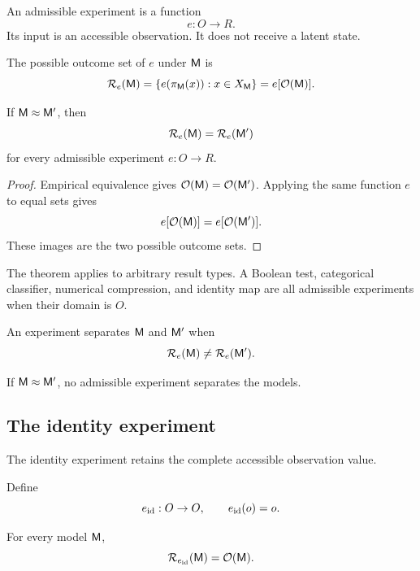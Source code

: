 \begin{definition}
An admissible experiment is a function
\[
e:O\to R.
\]
Its input is an accessible observation. It does not receive a latent state.
\end{definition}
\begin{definition}
The possible outcome set of \(e\) under \(\mathsf M\) is
\[
\mathcal R_e(\mathsf M)
=
\{e(\pi_\mathsf M(x)):x\in X_\mathsf M\}
=
e[\mathcal O(\mathsf M)].
\]
\end{definition}
\begin{theorem}
If \(\mathsf M\approx\mathsf M'\), then
\[
\mathcal R_e(\mathsf M)=\mathcal R_e(\mathsf M')
\]
for every admissible experiment \(e:O\to R\).
\label{thm:outcomeinvariance}
\end{theorem}

\begin{proof}
Empirical equivalence gives \(\mathcal O(\mathsf M)=\mathcal O(\mathsf M')\). Applying the same function \(e\) to equal sets gives
\[
e[\mathcal O(\mathsf M)]=e[\mathcal O(\mathsf M')].
\]
These images are the two possible outcome sets.
\end{proof}
The theorem applies to arbitrary result types. A Boolean test, categorical classifier, numerical compression, and identity map are all admissible experiments when their domain is \(O\).

\begin{definition}
An experiment separates \(\mathsf M\) and \(\mathsf M'\) when
\[
\mathcal R_e(\mathsf M)\neq\mathcal R_e(\mathsf M').
\]
\end{definition}
\begin{corollary}
If \(\mathsf M\approx\mathsf M'\), no admissible experiment separates the models.
\end{corollary}
\subsection{The identity experiment}

The identity experiment retains the complete accessible observation value.

\begin{definition}
Define
\[
e_{\operatorname{id}}:O\to O,
\qquad
e_{\operatorname{id}}(o)=o.
\]
\end{definition}
\begin{proposition}
For every model \(\mathsf M\),
\[
\mathcal R_{e_{\operatorname{id}}}(\mathsf M)=\mathcal O(\mathsf M).
\]
\end{proposition}

